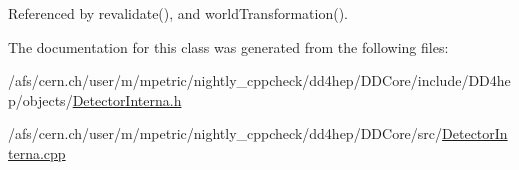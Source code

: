 Referenced by revalidate(), and world\+Transformation().



The documentation for this class was generated from the following files\+:\begin{DoxyCompactItemize}
\item 
/afs/cern.\+ch/user/m/mpetric/nightly\+\_\+cppcheck/dd4hep/\+D\+D\+Core/include/\+D\+D4hep/objects/\hyperlink{_detector_interna_8h}{Detector\+Interna.\+h}\item 
/afs/cern.\+ch/user/m/mpetric/nightly\+\_\+cppcheck/dd4hep/\+D\+D\+Core/src/\hyperlink{_detector_interna_8cpp}{Detector\+Interna.\+cpp}\end{DoxyCompactItemize}
